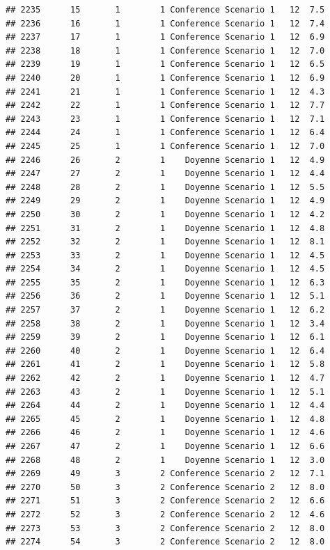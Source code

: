 \documentclass[
]{article}
\begin{document}
\begin{verbatim}
## 2235      15       1        1 Conference Scenario 1   12  7.5
## 2236      16       1        1 Conference Scenario 1   12  7.4
## 2237      17       1        1 Conference Scenario 1   12  6.9
## 2238      18       1        1 Conference Scenario 1   12  7.0
## 2239      19       1        1 Conference Scenario 1   12  6.5
## 2240      20       1        1 Conference Scenario 1   12  6.9
## 2241      21       1        1 Conference Scenario 1   12  4.3
## 2242      22       1        1 Conference Scenario 1   12  7.7
## 2243      23       1        1 Conference Scenario 1   12  7.1
## 2244      24       1        1 Conference Scenario 1   12  6.4
## 2245      25       1        1 Conference Scenario 1   12  7.0
## 2246      26       2        1    Doyenne Scenario 1   12  4.9
## 2247      27       2        1    Doyenne Scenario 1   12  4.4
## 2248      28       2        1    Doyenne Scenario 1   12  5.5
## 2249      29       2        1    Doyenne Scenario 1   12  4.9
## 2250      30       2        1    Doyenne Scenario 1   12  4.2
## 2251      31       2        1    Doyenne Scenario 1   12  4.8
## 2252      32       2        1    Doyenne Scenario 1   12  8.1
## 2253      33       2        1    Doyenne Scenario 1   12  4.5
## 2254      34       2        1    Doyenne Scenario 1   12  4.5
## 2255      35       2        1    Doyenne Scenario 1   12  6.3
## 2256      36       2        1    Doyenne Scenario 1   12  5.1
## 2257      37       2        1    Doyenne Scenario 1   12  6.2
## 2258      38       2        1    Doyenne Scenario 1   12  3.4
## 2259      39       2        1    Doyenne Scenario 1   12  6.1
## 2260      40       2        1    Doyenne Scenario 1   12  6.4
## 2261      41       2        1    Doyenne Scenario 1   12  5.8
## 2262      42       2        1    Doyenne Scenario 1   12  4.7
## 2263      43       2        1    Doyenne Scenario 1   12  5.1
## 2264      44       2        1    Doyenne Scenario 1   12  4.4
## 2265      45       2        1    Doyenne Scenario 1   12  4.8
## 2266      46       2        1    Doyenne Scenario 1   12  4.6
## 2267      47       2        1    Doyenne Scenario 1   12  6.6
## 2268      48       2        1    Doyenne Scenario 1   12  3.0
## 2269      49       3        2 Conference Scenario 2   12  7.1
## 2270      50       3        2 Conference Scenario 2   12  8.0
## 2271      51       3        2 Conference Scenario 2   12  6.6
## 2272      52       3        2 Conference Scenario 2   12  4.6
## 2273      53       3        2 Conference Scenario 2   12  8.0
## 2274      54       3        2 Conference Scenario 2   12  8.0

\end{verbatim}
\end{document}
